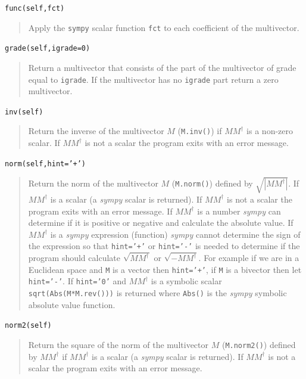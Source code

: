 \documentclass[12pt]{report}
\newcommand{\abs}[1]{\left |{#1}\right |}
\newcommand{\R}{\dagger}
\newcommand{\T}[1]{\texttt{#1}}
\begin{document}
\T{func(self,fct)}
\begin{quote}
   Apply the \T{sympy} scalar function \T{fct} to each coefficient of the multivector.
\end{quote}

\T{grade(self,igrade=0)}
\begin{quote}
    Return a multivector that consists of the part of the multivector of
    grade equal to \T{igrade}.  If the multivector has no \T{igrade} part
    return a zero multivector.
\end{quote}

\T{inv(self)}
\begin{quote}
   Return the inverse of the multivector $M$ (\T{M.inv()}) if $MM^{\R}$ is a non-zero scalar.  If $MM^{\R}$
   is not a scalar the program exits with an error message.
\end{quote}

\T{norm(self,hint='+')}
\begin{quote}
   Return the norm of the multivector $M$ (\T{M.norm()}) defined by $\sqrt{\abs{MM^{\R}}}$.  If $MM^{\R}$ is a scalar (a \emph{sympy} scalar
   is returned).  If $MM^{\R}$ is not a scalar the program exits with an error message. If $MM^{\R}$ is a number \emph{sympy} can determine
   if it is positive or negative and calculate the absolute value.  If $MM^{\R}$ is a \emph{sympy} expression (function) \emph{sympy} cannot
   determine the sign of the expression so that \T{hint='+'} or \T{hint='-'} is needed to determine if the program should calculate
   $\sqrt{MM^{\R}}$ or $\sqrt{-MM^{\R}}$. For example if we are in a Euclidean space and \T{M} is a vector then \T{hint='+'}, if
   \T{M} is a bivector then let \T{hint='-'}. If \T{hint='0'} and $MM^{\R}$ is a symbolic scalar \T{sqrt(Abs(M*M.rev()))} is returned 
   where \T{Abs()} is the \emph{sympy} symbolic absolute value function.
\end{quote}

\T{norm2(self)}
\begin{quote}
   Return the square of the norm of the multivector $M$ (\T{M.norm2()}) defined by $MM^{\R}$ if $MM^{\R}$ is a scalar (a \emph{sympy} scalar
   is returned).  If $MM^{\R}$ is not a scalar the program exits with an error message.
\end{quote}

\end{document}
